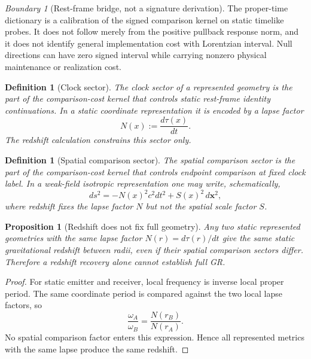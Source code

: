 \documentclass[11pt]{article}
\newtheorem{proposition}[theorem]{Proposition}
\newtheorem{definition}[theorem]{Definition}
\theoremstyle{remark}
\newtheorem{warning}[theorem]{Boundary}
\begin{document}
\begin{warning}[Rest-frame bridge, not a signature derivation]
The proper-time dictionary is a calibration of the signed comparison kernel on static timelike probes.  It does not follow merely from the positive pullback response norm, and it does not identify general implementation cost with Lorentzian interval.  Null directions can have zero signed interval while carrying nonzero physical maintenance or realization cost.
\end{warning}

\begin{definition}[Clock sector]
The \emph{clock sector} of a represented geometry is the part of the comparison-cost kernel that controls static rest-frame identity continuations.  In a static coordinate representation it is encoded by a lapse factor
\[
        N(x):=\frac{d\tau(x)}{dt}.
\]
The redshift calculation constrains this sector only.
\end{definition}

\begin{definition}[Spatial comparison sector]
The \emph{spatial comparison sector} is the part of the comparison-cost kernel that controls endpoint comparison at fixed clock label.  In a weak-field isotropic representation one may write, schematically,
\[
        ds^2=-N(x)^2c^2dt^2 + S(x)^2\,d\mathbf x^2,
\]
where redshift fixes the lapse factor \(N\) but not the spatial scale factor \(S\).
\end{definition}

\begin{proposition}[Redshift does not fix full geometry]
\label{prop:redshift-not-full-geometry}
Any two static represented geometries with the same lapse factor \(N(r)=d\tau(r)/dt\) give the same static gravitational redshift between radii, even if their spatial comparison sectors differ.  Therefore a redshift recovery alone cannot establish full GR.
\end{proposition}

\begin{proof}
For static emitter and receiver, local frequency is inverse local proper period.  The same coordinate period is compared against the two local lapse factors, so
\[
        \frac{\omega_A}{\omega_B}=\frac{N(r_B)}{N(r_A)}.
\]
No spatial comparison factor enters this expression.  Hence all represented metrics with the same lapse produce the same redshift.
\end{proof}
\end{document}
